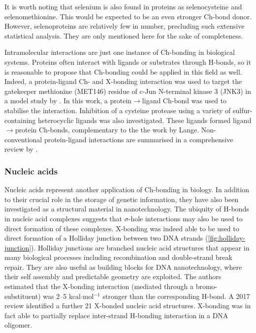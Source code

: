 \begin{refsection}
It is worth noting that selenium is also found in proteins as selenocysteine and selenomethionine.
This would be expected to be an even stronger Ch-bond donor.
However, selenoproteins are relatively few in number, precluding such extensive statistical analysis.\autocite{Iwaoka2015}
They are only mentioned here for the sake of completeness.

Intramolecular interactions are just one instance of Ch-bonding in biological systems.
Proteins often interact with ligands or substrates through H-bonds, so it is reasonable to propose that Ch-bonding could be applied in this field as well.
Indeed, a protein-ligand Ch- and X-bonding interaction was used to target the gatekeeper methionine (MET146) residue of c-Jun N-terminal kinase 3 (JNK3) in a model study by \citeauthor{Lange2015}.\autocite{Lange2015}
In this work, a protein$ \rightarrow $ligand Ch-bond was used to stabilise the interaction.
Inhibition of a cysteine protease using a variety of sulfur-containing heterocyclic ligands was also investigated.\autocite{Giroud2017}
These ligands formed ligand$ \rightarrow $protein Ch-bonds, complementary to the the work by Lange.
Non-conventional protein-ligand interactions are summarised in a comprehensive review by \citeauthor{Beno2015}.\autocite{Beno2015}

\subsubsection{Nucleic acids}
Nucleic acids represent another application of Ch-bonding in biology.
In addition to their crucial role in the storage of genetic information, they have also been investigated as a structural material in nanotechnology.
The ubiquity of H-bonds in nucleic acid complexes suggests that $ \sigma $-hole interactions may also be used to direct formation of these complexes.
X-bonding was indeed able to be used to direct formation of a Holliday junction between two DNA strands (\cref{fig:holliday-junction}).\autocite{Voth2007}
Holliday junctions are branched nucleic acid structures that appear in many biological processes including recombination and double-strand break repair.
They are also useful as building blocks for DNA nanotechnology, where their self assembly and predictable geometry are exploited.
The authors estimated that the X-bonding interaction (mediated through a bromo-substituent) was 2--5 kcal$\cdot$mol$^{-1}$ stronger than the corresponding H-bond.
A 2017 review identified a further 21 X-bonded nucleic acid structures.\autocite{Kolar2017}
X-bonding was in fact able to partially replace inter-strand H-bonding interaction in a DNA oligomer.\autocite{Parker2012}


\end{refsection}
